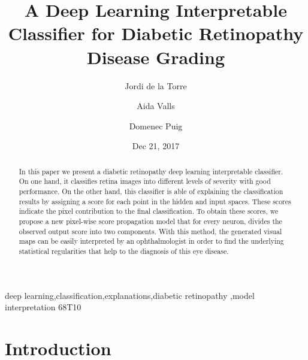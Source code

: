 \documentclass[review]{elsarticle}
\theoremstyle{definition} %
\theoremstyle{remark}
\begin{document}
\begin{frontmatter}

\title{A Deep Learning Interpretable Classifier for Diabetic Retinopathy Disease Grading}

\author[rvt]{Jordi de la Torre}
\author[rvt]{Aida Valls}
\author[rvt]{Domenec Puig}


\address[rvt]{Departament d'Enginyeria Inform\`atica i Matem\`atiques.\\Escola T\`ecnica Superior d'Enginyeria.\\Universitat Rovira i Virgili\\Avinguda Paisos Catalans, 26. E-43007\\
Tarragona, Spain}

\date{Dec 21, 2017}

\begin{abstract}
In this paper we present a diabetic retinopathy deep learning interpretable classifier. On one hand, it classifies retina images into different levels of severity with good performance. On the other hand, this classifier is able of explaining the classification results by assigning a score for each point in the hidden and input spaces. These scores indicate the pixel contribution to the final classification. To obtain these scores, we propose a new pixel-wise score propagation model that for every neuron, divides the observed output score into two components. With this method, the generated visual maps can be easily interpreted by an ophthalmologist in order to find the underlying statistical regularities that help to the diagnosis of this eye disease.
\end{abstract}

\begin{keyword}
deep learning\sep classification\sep explanations\sep diabetic retinopathy \sep model interpretation
\MSC[2010] 68T10
\end{keyword}

\end{frontmatter}


\section{Introduction}
\end{document}
